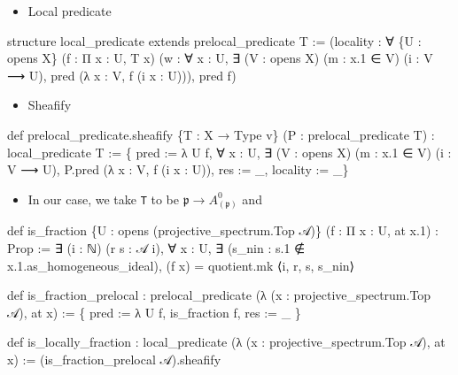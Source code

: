 \documentclass[11pt]{article}
\providecommand{\tightlist}{%
      \setlength{\itemsep}{0pt}\setlength{\parskip}{0pt}}
\newenvironment{Shaded}{}{}
\newcommand{\NormalTok}[1]{{#1}}
\begin{document}
    \begin{itemize}
\tightlist
\item
  Local predicate
\end{itemize}

\begin{Shaded}
\begin{Highlighting}[]
\NormalTok{structure local\_predicate extends prelocal\_predicate T :=}
\NormalTok{(locality : ∀ \{U : opens X\} (f : Π x : U, T x)}
\NormalTok{  (w : ∀ x : U, ∃ (V : opens X) (m : x.1 ∈ V) (i : V ⟶ U), }
\NormalTok{      pred (λ x : V, f (i x : U))), pred f)}
\end{Highlighting}
\end{Shaded}

    \begin{itemize}
\tightlist
\item
  Sheafify
\end{itemize}

\begin{Shaded}
\begin{Highlighting}[]
\NormalTok{def prelocal\_predicate.sheafify }
\NormalTok{    \{T : X → Type v\} }
\NormalTok{    (P : prelocal\_predicate T) : local\_predicate T :=}
\NormalTok{\{ pred := λ U f, }
\NormalTok{    ∀ x : U, ∃ (V : opens X) (m : x.1 ∈ V) (i : V ⟶ U), }
\NormalTok{        P.pred (λ x : V, f (i x : U)),}
\NormalTok{  res := \_,}
\NormalTok{  locality := \_\}}
\end{Highlighting}
\end{Shaded}

    

    \begin{itemize}
\tightlist
\item
  In our case, we take \texttt{T} to be
  \(\mathfrak p\to A^0_{(\mathfrak p)}\) and
\end{itemize}

\begin{Shaded}
\begin{Highlighting}[]
\NormalTok{def is\_fraction }
\NormalTok{    \{U : opens (projective\_spectrum.Top 𝒜)\} }
\NormalTok{    (f : Π x : U, at x.1) : Prop :=}
\NormalTok{∃ (i : ℕ) (r s : 𝒜 i),}
\NormalTok{  ∀ x : U, ∃ (s\_nin : s.1 ∉ x.1.as\_homogeneous\_ideal),}
\NormalTok{  (f x) = quotient.mk\textquotesingle{} ⟨i, r, s, s\_nin⟩}

\NormalTok{def is\_fraction\_prelocal : }
\NormalTok{    prelocal\_predicate (λ (x : projective\_spectrum.Top 𝒜), at x) :=}
\NormalTok{\{ pred := λ U f, is\_fraction f,}
\NormalTok{  res := \_ \}}

\NormalTok{def is\_locally\_fraction : }
\NormalTok{    local\_predicate (λ (x : projective\_spectrum.Top 𝒜), at x) :=}
\NormalTok{(is\_fraction\_prelocal 𝒜).sheafify}
\end{Highlighting}
\end{Shaded}
\end{document}
